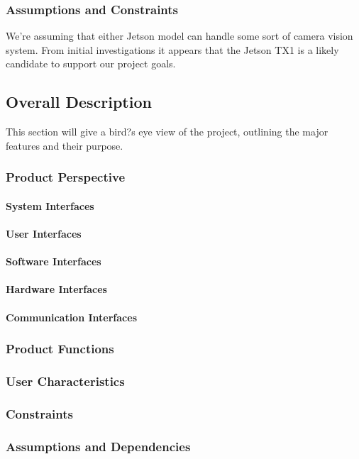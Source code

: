 \subsubsection{Assumptions and Constraints}
We're assuming that either Jetson model can handle some sort of camera vision system. From initial investigations it appears that the Jetson TX1 is a likely candidate to support our project goals.\\


\subsection{Overall Description}
This section will give a bird?s eye view of the project, outlining the major features and their purpose.
\subsubsection{Product Perspective}
  \paragraph{System Interfaces}
  \paragraph{User Interfaces}
  \paragraph{Software Interfaces}
  \paragraph{Hardware Interfaces}
  \paragraph{Communication Interfaces}
\subsubsection{Product Functions}
\subsubsection{User Characteristics}
\subsubsection{Constraints}
\subsubsection{Assumptions and Dependencies}
